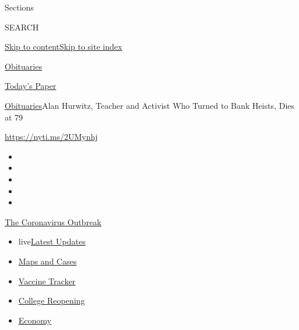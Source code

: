 Sections

SEARCH

\protect\hyperlink{site-content}{Skip to
content}\protect\hyperlink{site-index}{Skip to site index}

\href{https://www.nytimes3xbfgragh.onion/section/obituaries}{Obituaries}

\href{https://myaccount.nytimes3xbfgragh.onion/auth/login?response_type=cookie\&client_id=vi}{}

\href{https://www.nytimes3xbfgragh.onion/section/todayspaper}{Today's
Paper}

\href{/section/obituaries}{Obituaries}\textbar{}Alan Hurwitz, Teacher
and Activist Who Turned to Bank Heists, Dies at 79

\url{https://nyti.ms/2UMynhj}

\begin{itemize}
\item
\item
\item
\item
\item
\end{itemize}

\href{https://www.nytimes3xbfgragh.onion/news-event/coronavirus?action=click\&pgtype=Article\&state=default\&region=TOP_BANNER\&context=storylines_menu}{The
Coronavirus Outbreak}

\begin{itemize}
\tightlist
\item
  live\href{https://www.nytimes3xbfgragh.onion/2020/08/04/world/coronavirus-covid-19.html?action=click\&pgtype=Article\&state=default\&region=TOP_BANNER\&context=storylines_menu}{Latest
  Updates}
\item
  \href{https://www.nytimes3xbfgragh.onion/interactive/2020/us/coronavirus-us-cases.html?action=click\&pgtype=Article\&state=default\&region=TOP_BANNER\&context=storylines_menu}{Maps
  and Cases}
\item
  \href{https://www.nytimes3xbfgragh.onion/interactive/2020/science/coronavirus-vaccine-tracker.html?action=click\&pgtype=Article\&state=default\&region=TOP_BANNER\&context=storylines_menu}{Vaccine
  Tracker}
\item
  \href{https://www.nytimes3xbfgragh.onion/2020/08/02/us/covid-college-reopening.html?action=click\&pgtype=Article\&state=default\&region=TOP_BANNER\&context=storylines_menu}{College
  Reopening}
\item
  \href{https://www.nytimes3xbfgragh.onion/live/2020/08/03/business/stock-market-today-coronavirus?action=click\&pgtype=Article\&state=default\&region=TOP_BANNER\&context=storylines_menu}{Economy}
\end{itemize}

